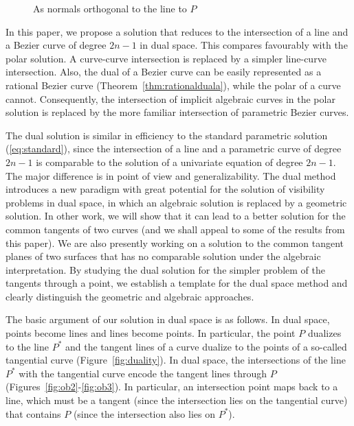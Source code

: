 \documentclass[twocolumn,10pt]{article}
\begin{document}


\begin{figure}
\hspace{.3in} \setjjpost
\caption{As normals orthogonal to the line to $P$}
\label{fig:standard}
\end{figure}

In this paper, we propose a solution 
that reduces to the intersection of a line and a Bezier curve 
of degree $2n-1$ in dual space.
This compares favourably with the polar solution.
A curve-curve intersection is replaced by a simpler line-curve intersection.
Also, the dual of a Bezier curve
can be easily represented as a rational Bezier curve (Theorem~\ref{thm:rationalduala}),
while the polar of a curve cannot.
Consequently, the intersection of implicit algebraic curves in the polar solution
is replaced by the more familiar intersection of parametric Bezier curves.

The dual solution is similar in efficiency to the standard parametric
solution (\ref{eq:standard}), since the intersection of a line and a parametric
curve of degree $2n-1$ is comparable to the solution of a univariate equation
of degree $2n-1$.
The major difference is in point of view and generalizability.
The dual method introduces a new paradigm with great potential for the
solution of visibility problems in dual space,
in which an algebraic solution is replaced by a geometric solution.
In other work, we will show that it can lead to a better solution
for the common tangents of two curves \cite{jj00}
(and we shall appeal to some of the results from this paper).
We are also presently working on a solution to the common tangent planes of two
surfaces that has no comparable solution under the algebraic interpretation.
By studying the dual solution for the simpler problem of 
the tangents through a point,
we establish a template for the dual space method
and clearly distinguish the geometric and algebraic approaches.

The basic argument of our solution in dual space is as follows.
In dual space, points become lines and lines become points.
In particular, the point $P$ dualizes to the line $P^*$ and 
the tangent lines of a curve dualize to the points of a so-called 
tangential curve (Figure~\ref{fig:duality}).
In dual space, the intersections of the line $P^*$ with the tangential curve
encode the tangent lines through $P$
(Figures~\ref{fig:ob2}-\ref{fig:ob3}).
In particular, an intersection point maps back to a line, which
must be a tangent (since the intersection lies on the tangential curve)
that contains $P$ (since the intersection also lies on $P^*$).
\end{document}
